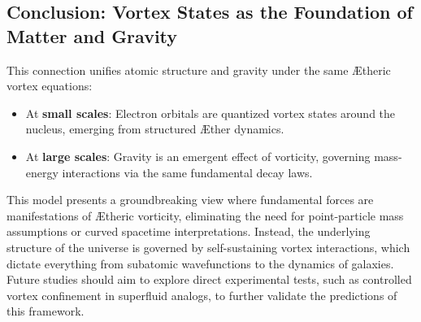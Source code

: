 \subsection*{Conclusion: Vortex States as the Foundation of Matter and Gravity}


This connection unifies atomic structure and gravity under the same \AE theric vortex equations:
\begin{itemize}
\item At \textbf{small scales}: Electron orbitals are quantized vortex states around the nucleus, emerging from structured \AE ther dynamics.
\item At \textbf{large scales}: Gravity is an emergent effect of vorticity, governing mass-energy interactions via the same fundamental decay laws.
\end{itemize}
This model presents a groundbreaking view where fundamental forces are manifestations of \AE theric vorticity, eliminating the need for point-particle mass assumptions or curved spacetime interpretations. Instead, the underlying structure of the universe is governed by self-sustaining vortex interactions, which dictate everything from subatomic wavefunctions to the dynamics of galaxies. Future studies should aim to explore direct experimental tests, such as controlled vortex confinement in superfluid analogs, to further validate the predictions of this framework.

